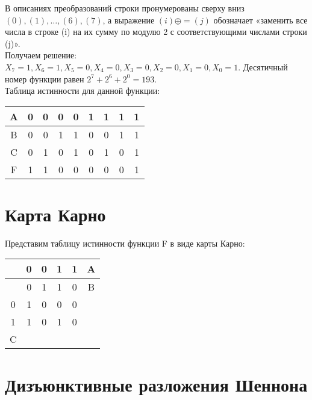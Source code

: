 \documentclass[a4paper,10pt]{article} %
\begin{document}
	\noindent В описаниях преобразований строки пронумерованы сверху вниз $(0),
	(1), …, (6), (7)$, а выражение $(i) \oplus= (j)$ обозначает  
	«заменить все числа в строке (i) на их сумму по модулю 2 с соответствующими числами строки (j)». \\

	\noindent Получаем решение:$ X_{7} = 1, X_{6} = 1, X_{5} = 0, X_{4} = 0, X_{3} = 0, X_{2} = 0, X_{1} = 0, X_{0} = 1$. Десятичный номер функции равен $2^7 + 2^6 + 2^0 = 193$. \\ 
	
	\noindent Таблица истинности для данной функции:\\
	
	\begin{tabular}{|c|c|c|c|c|c|c|c|c|}
		\hline 
		A & 0 & 0 & 0 & 0 & 1 & 1 & 1 & 1 \\ 
		\hline 
		B & 0 & 0 & 1 & 1 & 0 & 0 & 1 & 1 \\ 
		\hline 
		C & 0 & 1 & 0 & 1 & 0 & 1 & 0 & 1 \\ 
		\hline 
		F & 1 & 1 & 0 & 0 & 0 & 0 & 0 & 1 \\ 
		\hline 
	\end{tabular} 
	
	\section{Карта Карно}
	
	Представим таблицу истинности функции F в виде карты Карно: \\
	
	\begin{tabular}{|c|c|c|c|c|c|}
		\hline 
		& 0 & 0 & 1 & 1 & A \\ 
		\hline 
		& 0 & 1 & 1 & 0 & B \\ 
		\hline 
		0 & 1 & 0 & 0 & 0 &  \\ 
		\hline 
		1 & 1 & 0 & 1 & 0 &  \\ 
		\hline 
		C &  &  &  &  &  \\ 
		\hline 
	\end{tabular} 

	\section{Дизъюнктивные разложения Шеннона}
	
\end{document}
